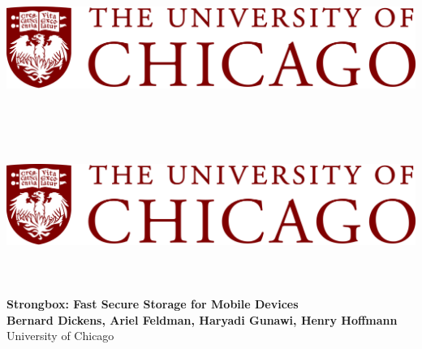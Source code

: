 \documentclass[a0,portrait]{a0poster}
\begin{document}


\begin{minipage}[b]{\linewidth}

\includegraphics[height=5cm]{figures/uchicago_logo.png}
\includegraphics[height=5cm]{figures/uchicago_logo.png}
\vspace{0.1cm}
\begin{center}
\noindent\makebox[\linewidth]{\rule{0.9\paperwidth}{0.4pt}}
\vspace{0.1cm}
\end{center}

\veryHuge \color{NavyBlue} \textbf{Strongbox: Fast Secure Storage for Mobile Devices} \color{Black}\\[0.5cm] %
\huge \textbf{Bernard Dickens, Ariel Feldman, Haryadi Gunawi, Henry Hoffmann}\\[0.25cm] %
\Large University of Chicago %
\end{minipage}
\end{document}
